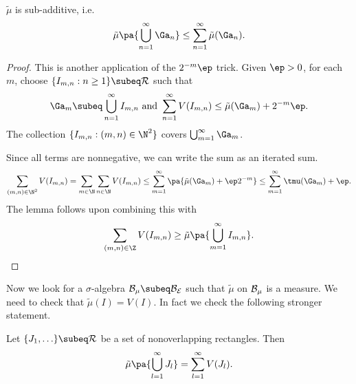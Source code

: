 \begin{lem}\label{tmusubadd}
$\tilde{\mu}$ is sub-additive, i.e.
\[
\tilde{\mu}\pa{\bigcup_{n=1}^{\infty} \Ga_n}\leq \sum_{n=1}^{\infty} \tilde{\mu}(\Ga_n).
\]
\end{lem}
\begin{proof}
This is another application of the $2^{-m}\ep$ trick. 
Given $\ep>0$, for each $m$, choose $\{I_{m,n}:n\geq 1\}\subeq \cal R$ such that
\[
\Ga_m\subeq \bigcup_{n=1}^{\infty} I_{m,n}\text{ and }
\sum_{n=1}^{\infty} V(I_{m,n})\leq \tilde{\mu}(\Ga_m)+2^{-m}\ep.
\] 
The collection $\{I_{m,n}:(m,n)\in \N^2\}$ covers $\bigcup_{m=1}^{\infty} \Ga_m$.

Since all terms are nonnegative, we can write the sum as an iterated sum.
\[
\sum_{(m,n)\in \N^2} V(I_{m,n})
=
\sum_{m\in \N}\sum_{n\in \N} V(I_{m,n})
\leq
\sum_{m=1}^{\infty} \pa{\tilde{\mu}(\Ga_m)+\ep2^{-m}}
\leq \sum_{m=1}^{\infty}\tmu(\Ga_m)+\ep.\]
The lemma follows upon combining this with
\[\sum_{(m,n)\in \Z} V(I_{m,n})\geq \tilde{\mu}\pa{\bigcup_{m=1}^{\infty}I_{m,n}}.\]
\end{proof}
Now we look for a $\sigma$-algebra $\cal B_{\mu}\subeq \cal B_{E}$ such that $\tilde{\mu}$ on $\cal B_{\mu}$ is a measure. We need to check that $\tilde{\mu}(I)=V(I)$. 
In fact we check the following stronger statement.
\begin{lem}\label{tmusum}
Let $\{J_1,\ldots\}\subeq \cal R$ be a set of nonoverlapping rectangles. Then
\[
\tilde{\mu}\pa{\bigcup_{l=1}^{\infty}  J_l}=
\sum_{l=1}^{\infty} V(J_l).
\]
\end{lem}
